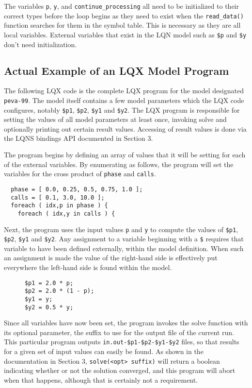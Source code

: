 The variables {\tt p}, {\tt y}, and {\tt continue\_processing} all need to be initialized to their correct 
types before the loop begins as they need to exist when the {\tt read\_data()} function searches for them
in the symbol table. This is necessary as they are all local variables. External variables that exist in
the LQN model such as {\tt \$p} and {\tt \$y} don't need initialization.

\subsection{Actual Example of an LQX Model Program}

The following LQX code is the complete LQX program for the model designated {\tt peva-99}.
The model itself contains a few model parameters which the LQX code configures, notably
{\tt \$p1}, {\tt \$p2}, {\tt \$y1} and {\tt \$y2}. The LQX program is responsible for
setting the values of all model parameters at least once, invoking solve and optionally
printing out certain result values. Accessing of result values is done via the LQNS 
bindings API documented in Section 3.

The program begins by defining an array of values that it will be setting for each of
the external variables. By enumerating as follows, the program will set the variables
for the cross product of {\tt phase} and {\tt calls}.

\lstset{language=C++}
\lstset{name=lqx-program}
\begin{lstlisting}
  phase = [ 0.0, 0.25, 0.5, 0.75, 1.0 ];
  calls = [ 0.1, 3.0, 10.0 ];
  foreach ( idx,p in phase ) {
    foreach ( idx,y in calls ) {\end{lstlisting}
    
    Next, the program uses the input values {\tt p} and {\tt y} to compute the values of
    {\tt \$p1}, {\tt \$p2}, {\tt \$y1} and {\tt \$y2}. Any assignment to a variable 
    beginning with a {\tt \$} requires that variable to have been defined externally,
    within the model definition. When such an assignment is made the value of the right-hand 
    side is effectively put everywhere the left-hand side is found within the model.

    \lstset{ firstnumber= 5  }  
    \begin{lstlisting}
      $p1 = 2.0 * p;
      $p2 = 2.0 * (1 - p);
      $y1 = y;
      $y2 = 0.5 * y;
    \end{lstlisting}
    
    Since all variables have now been set, the program invokes the solve function with
    its optional parameter, the suffix to use for the output file of the current run.
    This particular program outputs {\tt in.out-\$p1-\$p2-\$y1-\$y2} files, so that
    results for a given set of input values can easily be found. As shown in the 
    documentation in Section 3, {\tt solve(<opt> suffix)} will return a boolean
    indicating whether or not the solution converged, and this program will abort
    when that happens, although that is certainly not a requirement.
    
